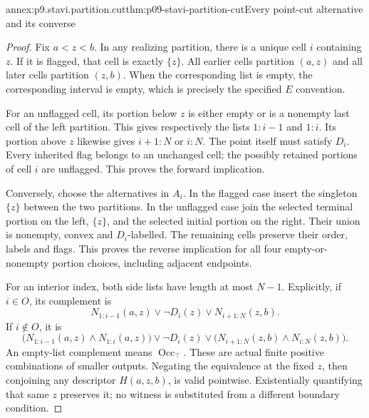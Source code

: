 \begin{annexitem}{annex:p9.stavi.partition.cut}{thm:p09-stavi-partition-cut}{Every point-cut alternative and its converse}
\begin{proof}
Fix \(a<z<b\). In any realizing partition,
there is a unique cell \(i\) containing \(z\).
If it is flagged, that cell is exactly
\(\{z\}\). All earlier cells partition
\((a,z)\) and all later cells partition
\((z,b)\). When the corresponding list
is empty, the corresponding interval is
empty, which is precisely the specified
\(E\) convention.

For an unflagged cell, its portion below
\(z\) is either empty or is a nonempty
last cell of the left partition. This
gives respectively the lists \(1:i-1\)
and \(1:i\). Its portion above \(z\)
likewise gives \(i+1:N\) or \(i:N\).
The point itself must satisfy \(D_i\).
Every inherited flag belongs to an
unchanged cell; the possibly retained
portions of cell \(i\) are unflagged.
This proves the forward implication.

Conversely, choose the alternatives
in \(A_i\). In the flagged case insert
the singleton \(\{z\}\) between the two
partitions. In the unflagged case
join the selected terminal portion
on the left, \(\{z\}\), and the
selected initial portion on the
right. Their union is nonempty,
convex and \(D_i\)-labelled. The
remaining cells preserve their
order, labels and flags. This
proves the reverse implication
for all four empty-or-nonempty
portion choices, including adjacent
endpoints.

For an interior index, both side
lists have length at most \(N-1\).
Explicitly, if \(i\in O\), its
complement is
\[
 N_{1:i-1}(a,z)\lor\neg D_i(z)
                       \lor N_{i+1:N}(z,b).
\]
If \(i\notin O\), it is
\[
 \bigl(N_{1:i-1}(a,z)\land N_{1:i}(a,z)\bigr)
 \lor\neg D_i(z)\lor
 \bigl(N_{i+1:N}(z,b)\land N_{i:N}(z,b)\bigr).
\]
An empty-list complement means
\(\operatorname{Occ}_{\top}\).
These are actual finite positive
combinations of smaller outputs.
Negating the equivalence at the
fixed \(z\), then conjoining any
descriptor \(H(a,z,b)\), is valid
pointwise. Existentially quantifying
that same \(z\) preserves it;
no witness is substituted from a
different boundary condition.
\end{proof}
\end{annexitem}

